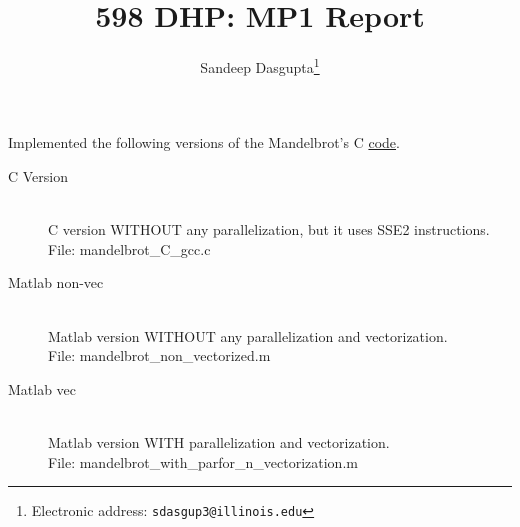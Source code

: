 \documentclass[10pt,twoside]{article}
\title{\textbf{ 598 DHP: MP1 Report}}
\author{Sandeep Dasgupta\thanks{Electronic address: \texttt{sdasgup3@illinois.edu}}}
\begin{document}
\thispagestyle{empty}

\maketitle

  Implemented the following versions of the Mandelbrot's C 
  \href{http://benchmarksgame.alioth.debian.org/u32/program.php?test=mandelbrot&lang=gcc}{code}.
  
  \begin{description}
    \item[C Version] \hfill \\
        C version  WITHOUT any parallelization, but it uses SSE2 instructions. \\
        File: mandelbrot\_C\_gcc.c
    \item[Matlab non-vec] \hfill \\
        Matlab version  WITHOUT any parallelization and vectorization.        \\
        File: mandelbrot\_non\_vectorized.m
    \item[Matlab vec] \hfill \\
        Matlab version  WITH  parallelization and vectorization. \\
        File: mandelbrot\_with\_parfor\_n\_vectorization.m
  \end{description}
\end{document}
